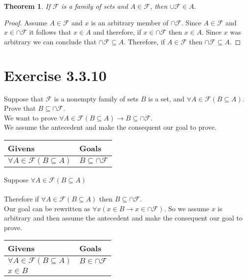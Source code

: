 \documentclass{article}
\newcommand{\n}{ \noindent }
\newcommand{\F}{\mathcal{F}}
\newtheorem*{theorem}{Theorem}  %
\begin{document}
\begin{theorem} If $\F$ is a family of sets and $A \in \F$, then $\cup \F \in A$.
\end{theorem}
\begin{proof}
Assume $A \in \F$ and $x$ is an arbitrary member of $\cap \F$. Since $A \in \F$ and $x \in \cap \F$ it follows that $x \in A$ and therefore, if $x \in \cap \F$ then $x \in A$. Since $x$ was arbitrary we can conclude that $\cap \F \subseteq A$. Therefore, if $A \in \F$ then $\cap \F \subseteq A$.
\end{proof}

\section*{Exercise 3.3.10}
Suppose that $\F$ is a nonempty family of sets $B$ is a set, and $\forall A \in \F(B \subseteq A)$. Prove that $B \subseteq \cap \F$. \\

\n We want to prove
$\forall A \in \F(B \subseteq A) \rightarrow B \subseteq \cap \F$. \\

\n We assume the antecedent and make the consequent our goal to prove. \\

\begin{table}[h]
\begin{tabular}{ll}
\hline
Givens & Goals   \\ \hline
$\forall A \in \F(B \subseteq A)$  & $B \subseteq \cap \F$   \\ \hline
\end{tabular}
\end{table}

\n Suppose $\forall A \in \F(B \subseteq A)$ \\
\indent [proof of $B \subseteq \cap \F$] \\
\n Therefore if $\forall A \in \F(B \subseteq A)$ then $B \subseteq \cap \F$. \\

\n Our goal can be rewritten as $\forall x(x \in B \rightarrow x \in \cap \F)$. So we assume $x$ is arbitrary and then assume the antecedent and make the consequent our goal to prove. \\

\begin{table}[h]
\begin{tabular}{ll}
\hline
Givens & Goals   \\ \hline
$\forall A \in \F(B \subseteq A)$  & $B \in \cap \F$   \\ 
$x \in B$ & \\ \hline
\end{tabular}
\end{table}
\end{document}
